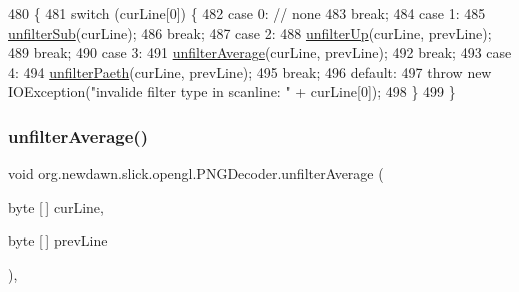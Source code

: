 \begin{DoxyCode}
480                                                                               \{
481         \textcolor{keywordflow}{switch} (curLine[0]) \{
482             \textcolor{keywordflow}{case} 0: \textcolor{comment}{// none}
483                 \textcolor{keywordflow}{break};
484             \textcolor{keywordflow}{case} 1:
485                 \mbox{\hyperlink{classorg_1_1newdawn_1_1slick_1_1opengl_1_1_p_n_g_decoder_a1939d148e672836c11da54bc8edf16fe}{unfilterSub}}(curLine);
486                 \textcolor{keywordflow}{break};
487             \textcolor{keywordflow}{case} 2:
488                 \mbox{\hyperlink{classorg_1_1newdawn_1_1slick_1_1opengl_1_1_p_n_g_decoder_a5d759acd42a8f0e0569c534c1a9bcf55}{unfilterUp}}(curLine, prevLine);
489                 \textcolor{keywordflow}{break};
490             \textcolor{keywordflow}{case} 3:
491                 \mbox{\hyperlink{classorg_1_1newdawn_1_1slick_1_1opengl_1_1_p_n_g_decoder_ae3f43d398d4d8cc4900900e9a3d0adff}{unfilterAverage}}(curLine, prevLine);
492                 \textcolor{keywordflow}{break};
493             \textcolor{keywordflow}{case} 4:
494                 \mbox{\hyperlink{classorg_1_1newdawn_1_1slick_1_1opengl_1_1_p_n_g_decoder_a19d3f37f70d1993a379d3573a5517b66}{unfilterPaeth}}(curLine, prevLine);
495                 \textcolor{keywordflow}{break};
496             \textcolor{keywordflow}{default}:
497                 \textcolor{keywordflow}{throw} \textcolor{keyword}{new} IOException(\textcolor{stringliteral}{"invalide filter type in scanline: "} + curLine[0]);
498         \}
499     \}
\end{DoxyCode}
\mbox{\label{classorg_1_1newdawn_1_1slick_1_1opengl_1_1_p_n_g_decoder_ae3f43d398d4d8cc4900900e9a3d0adff}} 
\subsubsection{\texorpdfstring{unfilter\+Average()}{unfilterAverage()}}
{\footnotesize\ttfamily void org.\+newdawn.\+slick.\+opengl.\+P\+N\+G\+Decoder.\+unfilter\+Average (\begin{DoxyParamCaption}\item[{byte \mbox{[}$\,$\mbox{]}}]{cur\+Line,  }\item[{byte \mbox{[}$\,$\mbox{]}}]{prev\+Line }\end{DoxyParamCaption})\hspace{0.3cm}{\ttfamily [inline]}, {\ttfamily [private]}}


